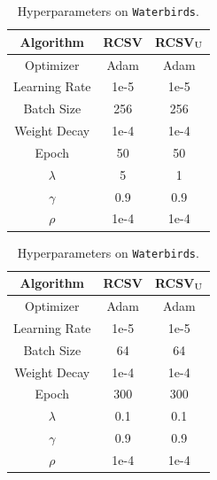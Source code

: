 \begin{table}[htbp]
	\begin{minipage}{0.5\linewidth}
		\caption{Hyperparameters on \texttt{CelebA}.}
		\label{tbl:celeba_hyp}
		\centering
		\begin{tabular}{c c c}
			\hline
			Algorithm & RCSV    & RCSV$_{\rm U}$ \\
			\hline
			Optimizer     &  Adam      & Adam  \\
			Learning Rate &  1e-5      & 1e-5 \\
			Batch Size    &  256       & 256   \\
			Weight Decay  &  1e-4      & 1e-4     \\
			Epoch         &  50        & 50   \\
			$\lambda$     &  5         & 1   \\
			$\gamma$      &  0.9       & 0.9  \\
			$\rho$        &  1e-4      & 1e-4  \\ 
			\hline
		\end{tabular}
	\end{minipage}
	\begin{minipage}{0.5\linewidth}
		\caption{Hyperparameters on \texttt{Waterbirds}.}
		\label{tbl:waterbirds}
		\centering
		\begin{tabular}{c c c}
			\hline
			Algorithm & RCSV    & RCSV$_{\rm U}$ \\
			\hline
			Optimizer     &  Adam      & Adam  \\
			Learning Rate &  1e-5      & 1e-5 \\
			Batch Size    &  64        & 64   \\
			Weight Decay  &  1e-4      & 1e-4     \\
			Epoch         &  300       & 300   \\
			$\lambda$     &  0.1       & 0.1   \\
			$\gamma$      &  0.9       & 0.9  \\
			$\rho$        &  1e-4      & 1e-4  \\ 
			\hline
		\end{tabular}
	\end{minipage}
\end{table}

